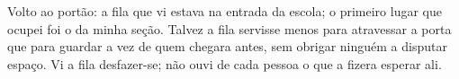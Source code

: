 Volto ao portão: a fila que vi estava na entrada da escola; o primeiro lugar que ocupei foi o da minha seção. Talvez a fila servisse menos para atravessar a porta que para guardar a vez de quem chegara antes, sem obrigar ninguém a disputar espaço. Vi a fila desfazer-se; não ouvi de cada pessoa o que a fizera esperar ali.
